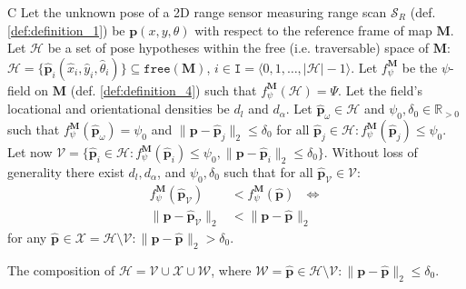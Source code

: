 \begin{customcnj}{C}
  \label{cnj:conjecture_c}
  Let the unknown pose of a 2D range sensor measuring range scan $\mathcal{S}_R$
  (def. \ref{def:definition_1}) be $\bm{p}(x,y,\theta)$ with respect to the
  reference frame of map $\bm{M}$.
  Let $\mathcal{H}$ be a set of pose hypotheses within the free (i.e.
  traversable) space of $\bm{M}$:
  $\mathcal{H} = \{\hat{\bm{p}}_i(\hat{x}_i,\hat{y}_i,\hat{\theta}_i)\} \subseteq \texttt{free}(\bm{M})$,
  $i \in \texttt{I} = \langle 0,1,\dots,|\mathcal{H}|-1\rangle$.
  Let $f_{\psi}^{\bm{M}}$ be the $\psi$-field on $\bm{M}$
  (def. \ref{def:definition_4})
  such that $f_{\psi}^{\bm{M}}(\mathcal{H})= \Psi$.
  Let the field's locational and orientational densities be
  $d_{l}$ and $d_{\alpha}$.
  Let $\hat{\bm{p}}_\omega \in \mathcal{H}$ and $\psi_0,\delta_0 \in \mathbb{R}_{>0}$
  such that $f_{\psi}^{\bm{M}}(\hat{\bm{p}}_\omega ) = \psi_0$ and
  $\|\bm{p}-\hat{\bm{p}}_j\|_2 \leq \delta_0$ for all
  $\hat{\bm{p}}_j \in \mathcal{H}: f_{\psi}^{\bm{M}}(\hat{\bm{p}}_j) \leq \psi_0$.
  Let now $\mathcal{V} = \{\hat{\bm{p}}_i \in \mathcal{H}: f_{\psi}^{\bm{M}}(\hat{\bm{p}}_i) \leq \psi_0,
  \|\bm{p}-\hat{\bm{p}}_i\|_2 \leq \delta_0\}$.
  Without loss of generality there exist $d_{l}, d_{\alpha}$, and
  $\psi_0,\delta_0$ such that for all
  $\hat{\bm{p}}_\mathcal{V} \in \mathcal{V}$:
  \begin{align}
    f_{\psi}^{\bm{M}}(\hat{\bm{p}}_\mathcal{V}) &< f_{\psi}^{\bm{M}}(\hat{\bm{p}}) \ \ \ \Leftrightarrow \nonumber \\
    \|\bm{p}-\hat{\bm{p}}_\mathcal{V}\|_2 &< \|\bm{p}-\hat{\bm{p}}_{}\|_2 \nonumber
  \end{align}
  for any $\hat{\bm{p}}_{} \in \mathcal{X} = \mathcal{H} \setminus  \mathcal{V}: \|\bm{p}-\hat{\bm{p}}_{}\|_2 > \delta_0$.
\end{customcnj}

\begin{remark}
  \label{rem:remark_1}
  The composition of
  $\mathcal{H} = \mathcal{V} \cup \mathcal{X} \cup \mathcal{W}$, where
  $\mathcal{W} = \hat{\bm{p}} \in {\mathcal{H} \setminus \mathcal{V}}: \|\bm{p}-\hat{\bm{p}}\|_2 \leq \delta_0$.
\end{remark}

